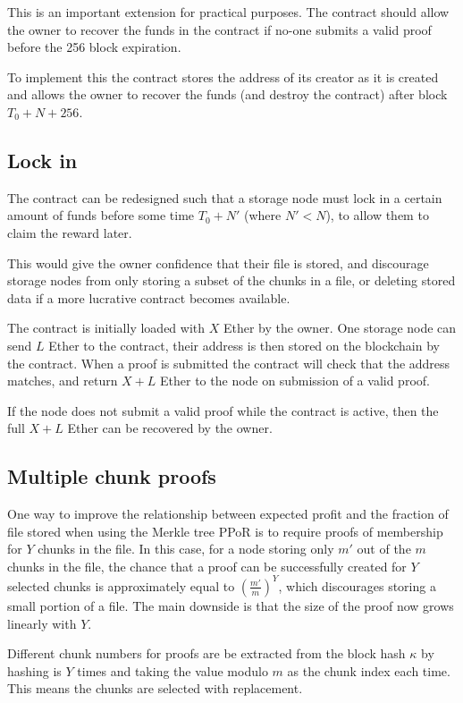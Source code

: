 \documentclass[12pt,a4paper,twoside,openright]{report}
\begin{document}
This is an important extension for practical purposes.
The contract should allow the owner to recover the funds in the contract if no-one submits a valid proof before the 256 block expiration.

To implement this the contract stores the address of its creator as it is created
and allows the owner to recover the funds (and destroy the contract) after block $T_0 + N + 256$.

\subsection{Lock in} \label{ext-lockin}

The contract can be redesigned such that a storage node must lock in a certain amount of funds before some time $T_0 + N'$ (where $N' < N$),
to allow them to claim the reward later.

This would give the owner confidence that their file is stored, and discourage storage nodes from only storing a subset of the chunks in a file,
or deleting stored data if a more lucrative contract becomes available.

The contract is initially loaded with $X$ Ether by the owner.
One storage node can send $L$ Ether to the contract, their address is then stored on the blockchain by the contract.
When a proof is submitted the contract will check that the address matches, and return $X + L$ Ether to the node
on submission of a valid proof.

If the node does not submit a valid proof while the contract is active, then the full $X + L$ Ether can be recovered by the owner.

\subsection{Multiple chunk proofs} \label{multi-chunk}

One way to improve the relationship between expected profit and the fraction of file stored
when using the Merkle tree PPoR is to require proofs of membership for $Y$ chunks in the file.
In this case, for a node storing only $m'$ out of the $m$ chunks in the file, the chance that a proof can be successfully created for $Y$ selected chunks is
approximately equal to $\left(\frac{m'}{m}\right)^Y$,
which discourages storing a small portion of a file.
The main downside is that the size of the proof now grows linearly with $Y$.

Different chunk numbers for proofs are be extracted from the block hash $\kappa$ by hashing is $Y$ times and taking the value modulo $m$
as the chunk index each time.
This means the chunks are selected with replacement.
\end{document}

